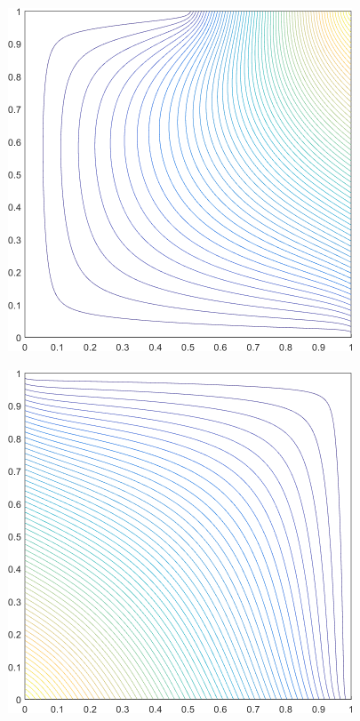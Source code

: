 \begin{figure}
\begin{subfigure}[b]{0.39\textwidth}
		\caption{}
	\end{subfigure}
	\hspace{1.5cm}
	\begin{subfigure}[b]{0.39\textwidth}
		\centering
		\includegraphics[width=\textwidth]{figures/sec_BF/deg_square_MV1_contour_b3.png}
		\caption{}
	\end{subfigure}
	\vfill
	\begin{subfigure}[b]{0.39\textwidth}
		\centering
		\includegraphics[width=\textwidth]{figures/sec_BF/deg_square_MV1_contour_b1.png}

\end{subfigure}
\end{figure}
